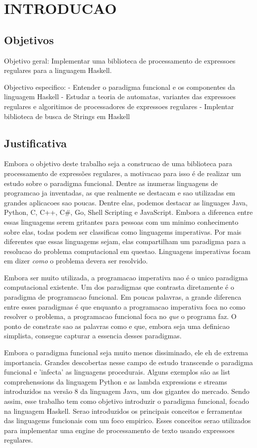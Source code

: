 \section{INTRODUCAO}
\subsection{Objetivos}
Objetivo geral: Implementar uma biblioteca de processamento de expressoes regulares para a linguagem Haskell.

Objectivo especifico:
- Entender o paradigma funcional e os componentes da linguagem Haskell
- Estudar a teoria de automatas, variantes das expressoes regulares e algoritimos de processadores de expressoes regulares
- Implentar biblioteca de busca de Strings em Haskell

\subsection{Justificativa}
Embora o objetivo deste trabalho seja a construcao de uma biblioteca para processamento de expressões regulares, a motivacao para isso é de realizar um estudo sobre o paradigma funcional.
Dentre as inumeras linguagens de programcao ja inventadas, as que realmente se destacam e sao utilizadas em grandes aplicacoes sao poucas.
Dentre elas, podemos destacar as linguages Java, Python, C, C++, C#, Go, Shell Scripting e JavaScript.
Embora a diferenca entre essas linguagems serem gritantes para pessoas com um minimo conhecimento sobre elas, todas podem ser classificas como linguagems imperativas.
Por mais diferentes que essas linguagems sejam, elas compartilham um paradigma para a resolucao do problema computacional em questao.
Linguagens imperativas focam em dizer \emph{como} o problema devera ser resolvido.

Embora ser muito utilizada, a programacao imperativa nao é o unico paradigma computacional existente.
Um dos paradigmas que contrasta diretamente é o paradigma de programacao funcional.
Em poucas palavras, a grande diferenca entre esses paradigmas é que enquanto a programacao imperativa foca no como resolver o problema, a programacao funcional foca no \emph{que} o programa faz.
O ponto de constrate sao as palavras como e que, embora seja uma definicao simplista, consegue capturar a essencia desses paradigmas.

Embora o paradigma funcional seja muito menos dissiminado, ele eh de extrema importancia.
Grandes descobertas nesse campo de estudo transcende o paradigma funcional e 'infecta' as linguagens procedurais.
Alguns exemplos são as list comprehenssions da linguagem Python e as lambda expressions e streams introduzidos na versão 8 da linguagem Java, um dos gigantes do mercado.
Sendo assim, esse trabalho tem como objetivo introduzir o paradigma funcional, focado na linguagem Haskell.
Serao introduzidos os principais conceitos e ferramentas das linguagems funcionais com um foco empirico.
Esses conceitos serao utilizados para implementar uma engine de processamento de texto usando expressoes regulares.

